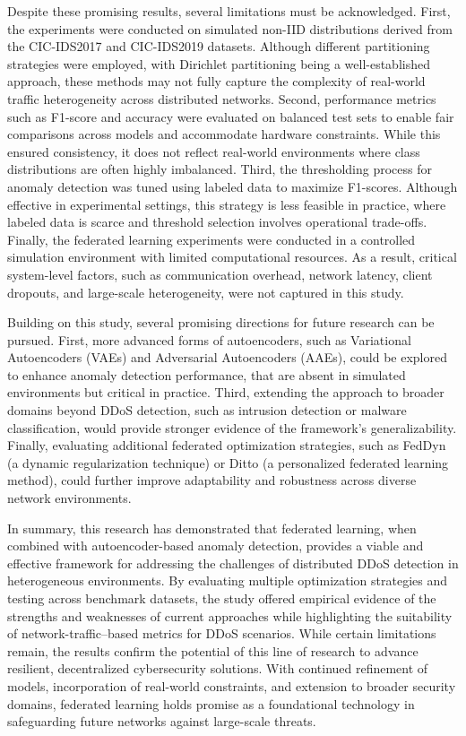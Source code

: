 Despite these promising results, several limitations must be acknowledged. First, the experiments were conducted on simulated non-IID distributions derived from the CIC-IDS2017 and CIC-IDS2019 datasets. Although different partitioning strategies were employed, with Dirichlet partitioning being a well-established approach, these methods may not fully capture the complexity of real-world traffic heterogeneity across distributed networks. Second, performance metrics such as F1-score and accuracy were evaluated on balanced test sets to enable fair comparisons across models and accommodate hardware constraints. While this ensured consistency, it does not reflect real-world environments where class distributions are often highly imbalanced. Third, the thresholding process for anomaly detection was tuned using labeled data to maximize F1-scores. Although effective in experimental settings, this strategy is less feasible in practice, where labeled data is scarce and threshold selection involves operational trade-offs. Finally, the federated learning experiments were conducted in a controlled simulation environment with limited computational resources. As a result, critical system-level factors, such as communication overhead, network latency, client dropouts, and large-scale heterogeneity, were not captured in this study.

Building on this study, several promising directions for future research can be pursued. First, more advanced forms of autoencoders, such as Variational Autoencoders (VAEs) and Adversarial Autoencoders (AAEs), could be explored to enhance anomaly detection performance, that are absent in simulated environments but critical in practice. Third, extending the approach to broader domains beyond DDoS detection, such as intrusion detection or malware classification, would provide stronger evidence of the framework’s generalizability. Finally, evaluating additional federated optimization strategies, such as FedDyn (a dynamic regularization technique) or Ditto (a personalized federated learning method), could further improve adaptability and robustness across diverse network environments.

In summary, this research has demonstrated that federated learning, when combined with autoencoder-based anomaly detection, provides a viable and effective framework for addressing the challenges of distributed DDoS detection in heterogeneous environments. By evaluating multiple optimization strategies and testing across benchmark datasets, the study offered empirical evidence of the strengths and weaknesses of current approaches while highlighting the suitability of network-traffic–based metrics for DDoS scenarios. While certain limitations remain, the results confirm the potential of this line of research to advance resilient, decentralized cybersecurity solutions. With continued refinement of models, incorporation of real-world constraints, and extension to broader security domains, federated learning holds promise as a foundational technology in safeguarding future networks against large-scale threats.
